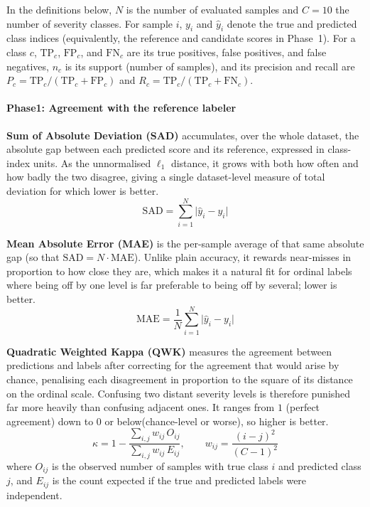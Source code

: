 \documentclass[conference]{IEEEtran}
\makeatletter
\let\end\a@l@end
\makeatother
\begin{document}
In the definitions below, $N$ is the number of evaluated samples and $C{=}10$ the number of severity classes. For sample $i$, $y_i$ and $\hat{y}_i$ denote the true and predicted class indices (equivalently, the reference and candidate scores in Phase~1). For a class $c$, $\mathrm{TP}_c$, $\mathrm{FP}_c$, and $\mathrm{FN}_c$ are its true positives, false positives, and false negatives, $n_c$ is its support (number of samples), and its precision and recall are $P_c = \mathrm{TP}_c/(\mathrm{TP}_c+\mathrm{FP}_c)$ and $R_c = \mathrm{TP}_c/(\mathrm{TP}_c+\mathrm{FN}_c)$. 

\paragraph{Phase1: Agreement with the reference labeler}
\textbf{Sum of Absolute Deviation (SAD)} \cite{huber1964robust} accumulates, over the whole dataset, the absolute gap between each predicted score and its reference, expressed in class-index units. As the unnormalised $\ell_1$ distance, it grows with both how often and how badly the two disagree, giving a single dataset-level measure of total deviation for which lower is better.
\begin{equation}
\text{SAD} = \sum_{i=1}^{N}\big|\hat{y}_i - y_i\big|
\end{equation}

\textbf{Mean Absolute Error (MAE)} \cite{willmott2005advantages} is the per-sample average of that same absolute gap (so that $\text{SAD} = N\cdot\text{MAE}$). Unlike plain accuracy, it rewards near-misses in proportion to how close they are, which makes it a natural fit for ordinal labels where being off by one level is far preferable to being off by several; lower is better.
\begin{equation}
\text{MAE} = \frac{1}{N}\sum_{i=1}^{N}\big|\hat{y}_i - y_i\big|
\end{equation}

\textbf{Quadratic Weighted Kappa (QWK)} \cite{cohen1968weighted} measures the
agreement between predictions and labels after correcting for the agreement that would arise by chance, penalising each disagreement in proportion to the square of its distance on the ordinal scale. Confusing two distant severity levels is therefore punished far more heavily than confusing adjacent ones. It ranges from $1$ (perfect agreement) down to $0$ or below(chance-level or worse), so higher is better.
\begin{equation}
\kappa = 1 - \frac{\sum_{i,j} w_{ij}\,O_{ij}}{\sum_{i,j} w_{ij}\,E_{ij}},
\qquad w_{ij} = \frac{(i-j)^2}{(C-1)^2}
\end{equation}
where $O_{ij}$ is the observed number of samples with true class $i$ and predicted class $j$, and $E_{ij}$ is the count expected if the true and predicted labels were independent.
\end{document}
